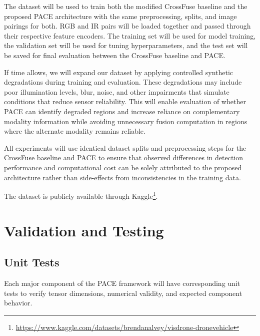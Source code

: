 \documentclass[conference]{IEEEtran}
\begin{document}
The dataset will be used to train both the modified CrossFuse baseline and the proposed PACE architecture with the same preprocessing, splits, and image pairings for both. RGB and IR pairs will be loaded together and passed through their respective feature encoders. The training set will be used for model training, the validation set will be used for tuning hyperparameters, and the test set will be saved for final evaluation between the CrossFuse baseline and PACE.

If time allows, we will expand our dataset by applying controlled synthetic degradations during training and evaluation. These degradations may include poor illumination levels, blur, noise, and other impairments that simulate conditions that reduce sensor reliability. This will enable evaluation of whether PACE can identify degraded regions and increase reliance on complementary modality information while avoiding unnecessary fusion computation in regions where the alternate modality remains reliable. 

All experiments will use identical dataset splits and preprocessing steps for the CrossFuse baseline and PACE to ensure that observed differences in detection performance and computational cost can be solely attributed to the proposed architecture rather than side-effects from inconsistencies in the training data.

The dataset is publicly available through Kaggle\footnote{\url{https://www.kaggle.com/datasets/brendanalvey/visdrone-dronevehicle}}.


\section{Validation and Testing}

\subsection{Unit Tests}

Each major component of the PACE framework will have corresponding unit tests to verify tensor dimensions, numerical validity, and expected component behavior.
\end{document}
